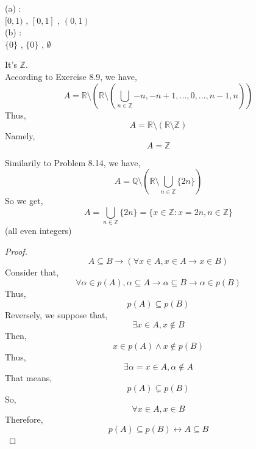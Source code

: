 \documentclass[a4paper, justified]{tufte-handout}
\begin{document}
\begin{problem}[UD Problem 8.1 (a, b)]
\end{problem}

\begin{solution}
  (a) :\\
    $[0,1)$ , $[0,1]$ , $(0,1)$ \\
  (b) :\\
    $\{0\}$ , $\{0\}$ , $\emptyset$ \\

\end{solution}

\begin{problem}[UD Problem 8.14]
\end{problem}

\begin{solution}
  It's $\mathbb{Z}$.\\
  According to Exercise 8.9, we have,
  $$ A = \mathbb{R} \setminus ( \mathbb{R} \setminus (\bigcup_{n\in \mathbb{Z}}{-n,-n+1,...,0,...,n-1,n}) ) $$
  Thus,
  $$ A = \mathbb{R} \setminus ( \mathbb{R} \setminus \mathbb{Z}) $$
  Namely,
  $$ A = \mathbb{Z} $$
\end{solution}

\begin{problem}[UD Problem 8.15]
\end{problem}

\begin{solution}
  Similarily to Problem 8.14, we have,
  $$ A = \mathbb{Q} \setminus (\mathbb{R} \setminus \bigcup_{n\in\mathbb{Z}} \{2n\} ) $$
  So we get,
  $$A= \bigcup_{n\in\mathbb{Z}} \{2n\} = \{x\in\mathbb{Z}:x=2n,n\in\mathbb{Z}\}$$
  (all even integers)
\end{solution}

\begin{problem}[UD Problem 9.8]
\end{problem}
  
\begin{proof}
  $$ A \subseteq B \rightarrow ( \forall x \in A, x \in A \rightarrow x \in B )$$
  Consider that,
  $$ \forall \alpha \in p(A), \alpha \subseteq A \rightarrow \alpha \subseteq B \rightarrow \alpha \in p(B)$$
  Thus,
  $$ p(A) \subseteq p(B) $$
  Reversely, we suppose that,
  $$ \exists x \in A, x \notin B $$
  Then,
  $$ {x} \in p(A) \wedge {x} \notin p(B)$$
  Thus,
  $$ \exists \alpha = {x} \in A, \alpha \notin A $$
  That means,
  $$ p(A) \subsetneq p(B) $$
  So,
  $$ \forall x \in A, x \in B $$
  Therefore,
  $$ p(A) \subseteq p(B) \leftrightarrow A \subseteq B $$
\end{proof}
\end{document}

